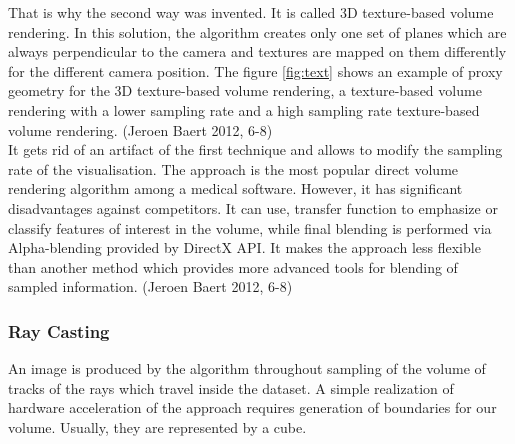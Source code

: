 \documentclass[twoside, english, 11pt]{report}
\begin{document}
That is why the second way was invented. It is called 3D texture-based volume rendering. In this solution, the algorithm creates only one set of planes which are always perpendicular to the camera and textures are mapped on them differently for the different camera position. The figure \ref{fig:text} shows an example of proxy geometry for the 3D texture-based volume rendering, a texture-based volume rendering with a lower sampling rate and a high sampling rate texture-based volume rendering. (Jeroen Baert 2012, 6-8)\\

It gets rid of an artifact of the first technique and allows to modify the sampling rate of the visualisation. The approach is the most popular direct volume rendering algorithm among a medical software. However, it has significant disadvantages against competitors. It can use, transfer function to emphasize or classify features of interest in the volume, while final blending is performed via Alpha-blending provided by DirectX API. It makes the approach less flexible than another method which provides more advanced tools for blending of sampled information. (Jeroen Baert 2012, 6-8)

\subsubsection{Ray Casting}

An image is produced by the algorithm throughout sampling of the volume of tracks of the rays which travel inside the dataset. A simple realization of hardware acceleration of the approach requires generation of boundaries for our volume. Usually, they are represented by a cube.\\
\end{document}
